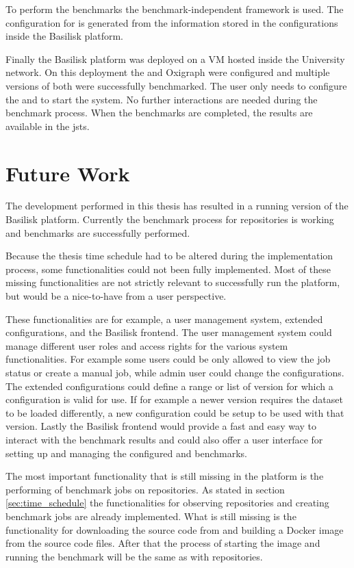 To perform the benchmarks the benchmark-independent \iguana{} framework is used.
The configuration for \iguana{} is generated from the information stored in the \ts{} configurations inside the Basilisk platform.

Finally the Basilisk platform was deployed on a VM hosted inside the University network.
On this deployment the \tentris{} and Oxigraph \tsp{} were configured and multiple versions of both \tsp{} were successfully benchmarked.
The user only needs to configure the \tsp{} and to start the system.
No further interactions are needed during the benchmark process.
When the benchmarks are completed, the results are available in the \acl{jsts}.



\section{Future Work}
\label{sec:future_work}
The development performed in this thesis has resulted in a running version of the Basilisk platform.
Currently the benchmark process for \dockh{} repositories is working and benchmarks are successfully performed.

Because the thesis time schedule had to be altered during the implementation process, some functionalities could not been fully implemented.
Most of these missing functionalities are not strictly relevant to successfully run the platform, but would be a nice-to-have from a user perspective.

These functionalities are for example, a user management system, extended \ts{} configurations, and the Basilisk frontend.
The user management system could manage different user roles and access rights for the various system functionalities.
For example some users could be only allowed to view the job status or create a manual job, while admin user could change the \ts{} configurations.
The extended \ts{} configurations could define a range or list of version for which a configuration is valid for use.
If for example a newer \ts{} version requires the dataset to be loaded differently, a new configuration could be setup to be used with that version.
Lastly the Basilisk frontend would provide a fast and easy way to interact with the benchmark results and could also offer a user interface for setting up and managing the configured \ts{} and benchmarks.

The most important functionality that is still missing in the platform is the performing of benchmark jobs on \gh{} repositories.
As stated in section \ref{sec:time_schedule} the functionalities for observing \gh{} repositories and creating benchmark jobs are already implemented.
What is still missing is the functionality for downloading the source code from \gh{} and building a Docker image from the source code files.
After that the process of starting the image and running the benchmark will be the same as with \dockh{} repositories.





